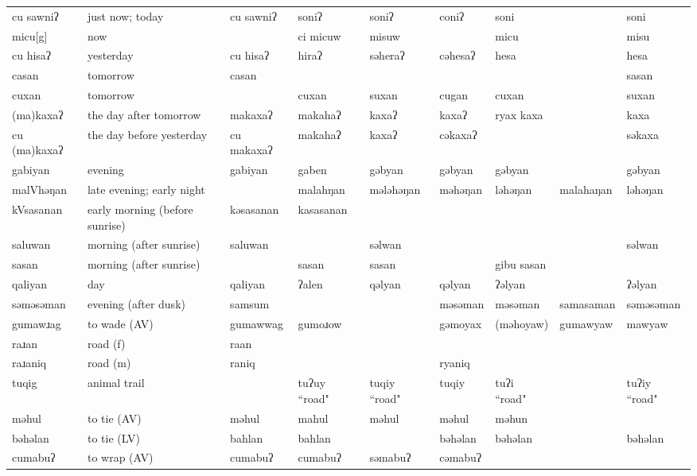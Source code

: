 \begin{landscape}
\begin{longtable}{*{9}{>{\raggedright\arraybackslash}p{}}}
\text{*}cu sawniʔ & just now; today & cu sawniʔ & soniʔ & soniʔ & coniʔ & soni &  & soni\\
\text{*}micu[g] & now &  & ci micuw & misuw &  & micu &  & misu\\
\text{*}cu hisaʔ & yesterday & cu hisaʔ & hiraʔ & səheraʔ & cəhesaʔ & hesa &  & hesa\\
\text{*}casan & tomorrow & casan &  &  &  &  &  & sasan\\
\text{*}cuxan & tomorrow &  & cuxan & suxan & cugan & cuxan &  & suxan\\
\text{*}(ma)kaxaʔ & the day after tomorrow & makaxaʔ & makahaʔ & kaxaʔ & kaxaʔ & ryax kaxa &  & kaxa\\
\text{*}cu (ma)kaxaʔ & the day before yesterday & cu makaxaʔ & makahaʔ & kaxaʔ & cəkaxaʔ &  &  & səkaxa\\
\text{*}gabiyan & evening & gabiyan & gaben & gəbyan & gəbyan & gəbyan &  & gəbyan\\
\text{*}malVhəŋan & late evening; early night &  & malahŋan & mələhəŋan & məhəŋan & ləhəŋan & malahaŋan & ləhəŋan\\
\text{*}kVsasanan & early morning (before sunrise) & kəsasanan & kasasanan &  &  &  &  & \\
\text{*}saluwan & morning (after sunrise) & saluwan &  & səlwan &  &  &  & səlwan\\
\text{*}sasan & morning (after sunrise) &  & sasan & sasan &  & gibu sasan &  & \\
\text{*}qaliyan & day & qaliyan & ʔalen & qəlyan & qəlyan & ʔəlyan &  & ʔəlyan\\
\text{*}səməsəman & evening (after dusk) & samsum &  &  & məsəman & məsəman & samasaman & səməsəman\\
\text{*}gumawɹag & to wade (AV) & gumawwag & gumoɹow &  & gəmoyax & (məhoyaw) & gumawyaw & mawyaw\\
\text{*}raɹan & road (f) & raan &  &  &  &  &  & \\
\text{*}raɹaniq & road (m) & raniq &  &  & ryaniq &  &  & \\
\text{*}tuqig & animal trail &  & tuʔuy ``road" & tuqiy ``road" & tuqiy & tuʔi ``road" &  & tuʔiy ``road"\\
\text{*}məhul & to tie (AV) & məhul & mahul & məhul & məhul & məhun &  & \\
\text{*}bəhəlan & to tie (LV) & bahlan & bahlan &  & bəhəlan & bəhəlan &  & bəhəlan\\
\text{*}cumabuʔ & to wrap (AV) & cumabuʔ & cumabuʔ & səmabuʔ & cəmabuʔ &  &  & \\

\end{longtable}
\end{landscape}
